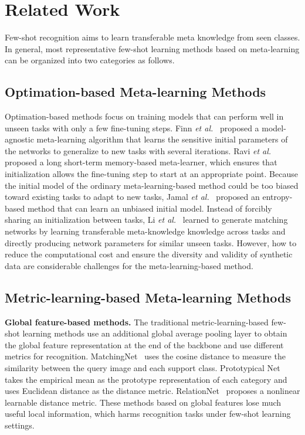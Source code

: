 \documentclass{SCIS2019}
\begin{document}
\section{Related Work}
Few-shot recognition aims to learn transferable meta knowledge from seen classes. In general, most representative few-shot learning methods based on meta-learning can be organized into two categories as follows.
\subsection{Optimation-based Meta-learning Methods}
Optimation-based methods focus on training models that can perform well in unseen tasks with only a few fine-tuning steps.
Finn \textit{et al.}~\cite{3} proposed a model-agnostic meta-learning algorithm that learns the sensitive initial parameters of the networks to generalize to new tasks with several iterations. Ravi \textit{et al.}~\cite{35} proposed a long short-term memory-based meta-learner, which ensures that initialization allows the fine-tuning step to start at an appropriate point. Because the initial model of the ordinary meta-learning-based method could be too biased toward existing tasks to adapt to new tasks, Jamal \textit{et al.}~\cite{36} proposed an entropy-based method that can learn an unbiased initial model. Instead of forcibly sharing an initialization between tasks, Li \textit{et al.}~\cite{37} learned to generate matching networks by learning transferable meta-knowledge knowledge across tasks and directly producing network parameters for similar unseen tasks. However, how to reduce the computational cost and ensure the diversity and validity of synthetic data are considerable challenges for the meta-learning-based method.

\subsection{Metric-learning-based Meta-learning Methods}
\textbf{Global feature-based methods.} The traditional metric-learning-based few-shot learning methods use an additional global average pooling layer to obtain the global feature representation at the end of the backbone and use different metrics for recognition.
MatchingNet~\cite{6} uses the cosine distance to measure the similarity between the query image and each support class.
Prototypical Net~\cite{7} takes the empirical mean as the prototype representation of each category and uses Euclidean distance as the distance metric. RelationNet~\cite{8} proposes a nonlinear learnable distance metric. These methods based on global features lose much useful local information, which harms recognition tasks under few-shot learning settings.
\end{document}
